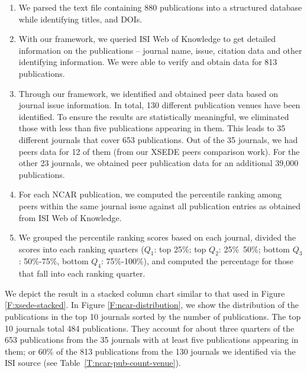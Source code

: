 \documentclass[10pt, conference, compsocconf]{IEEEtran}
\begin{document}
\begin{enumerate}

\item We parsed the text file containing 880 publications into a structured database while identifying titles, and DOIs.

\item With our framework, we queried ISI Web of Knowledge to get detailed information on the publications -- journal name, issue, citation data and other identifying information. We were able to verify and obtain data for 813 publications.

\item Through our framework, we identified and obtained peer data based on journal issue information. In total, 130 different publication venues have been identified. To ensure the results are statistically meaningful, we eliminated those with less than five publications appearing in them.  This leads to 35 different journals that cover 653 publications. Out of the 35 journals, we had peers data for 12 of them (from our XSEDE peers comparison work). For the other 23 journals, we obtained peer publication data for an additional 39,000 publications.

\item For each NCAR publication, we computed the percentile ranking among peers within the same journal issue against all publication entries as obtained from ISI Web of Knowledge.

\item We grouped the percentile ranking scores based on each journal, divided the scores into each ranking quarters ($Q_1$: top 25\%; top $Q_2$: 25\%~50\%; bottom $Q_3$: 50\%-75\%, bottom $Q_4$: 75\%-100\%), and computed the percentage for those that fall into each ranking quarter.

\end{enumerate}

We depict the result in a stacked column chart similar to that used in Figure \ref{F:xsede-stacked}.  In Figure \ref{F:ncar-distribution}, we show the distribution of the publications in the top 10 journals sorted by the number of publications. The top 10 journals total 484 publications. They account for about three quarters of the 653 publications from the 35 journals with at least five publications appearing in them; or 60\% of the 813 publications from the 130 journals we identified via the ISI source (see Table~\ref{T:ncar-pub-count-venue}).
\end{document}
